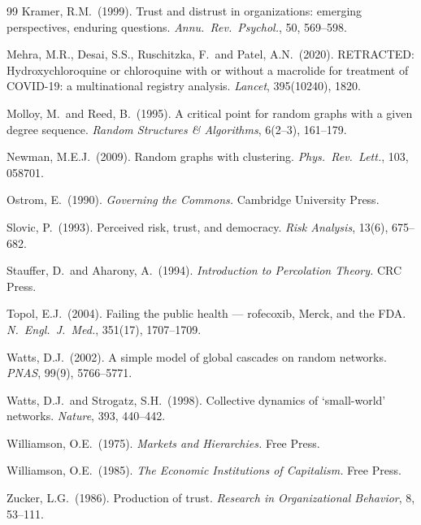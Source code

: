 \documentclass[11pt,a4paper]{article}
\begin{document}
\begin{thebibliography}{99}
Kramer, R.M.\ (1999).
Trust and distrust in organizations: emerging perspectives, enduring questions.
\emph{Annu.\ Rev.\ Psychol.}, 50, 569--598.

Mehra, M.R., Desai, S.S., Ruschitzka, F.\ and Patel, A.N.\ (2020).
RETRACTED: Hydroxychloroquine or chloroquine with or without a macrolide for treatment of COVID-19: a multinational registry analysis.
\emph{Lancet}, 395(10240), 1820.

Molloy, M.\ and Reed, B.\ (1995).
A critical point for random graphs with a given degree sequence.
\emph{Random Structures \& Algorithms}, 6(2--3), 161--179.

Newman, M.E.J.\ (2009).
Random graphs with clustering.
\emph{Phys.\ Rev.\ Lett.}, 103, 058701.

Ostrom, E.\ (1990).
\emph{Governing the Commons.}
Cambridge University Press.

Slovic, P.\ (1993).
Perceived risk, trust, and democracy.
\emph{Risk Analysis}, 13(6), 675--682.

Stauffer, D.\ and Aharony, A.\ (1994).
\emph{Introduction to Percolation Theory.}
CRC Press.

Topol, E.J.\ (2004).
Failing the public health --- rofecoxib, Merck, and the FDA.
\emph{N.\ Engl.\ J.\ Med.}, 351(17), 1707--1709.

Watts, D.J.\ (2002).
A simple model of global cascades on random networks.
\emph{PNAS}, 99(9), 5766--5771.

Watts, D.J.\ and Strogatz, S.H.\ (1998).
Collective dynamics of `small-world' networks.
\emph{Nature}, 393, 440--442.

Williamson, O.E.\ (1975).
\emph{Markets and Hierarchies.}
Free Press.

Williamson, O.E.\ (1985).
\emph{The Economic Institutions of Capitalism.}
Free Press.

Zucker, L.G.\ (1986).
Production of trust.
\emph{Research in Organizational Behavior}, 8, 53--111.

\end{thebibliography}


\end{document}
